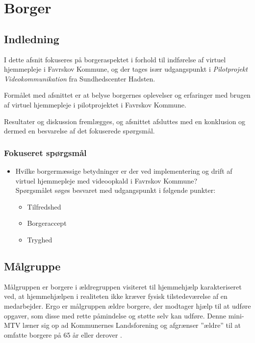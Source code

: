 \chapter{Borger}

\section{Indledning}
I dette afsnit fokuseres på borgeraspektet i forhold til indførelse af virtuel hjemmepleje i Favrskov Kommune, og der tages især udgangspunkt i \textit{Pilotprojekt Videokommunikation} fra Sundhedscenter Hadsten. 

Formålet med afsnittet er at belyse borgernes oplevelser og erfaringer med brugen af virtuel hjemmepleje i pilotprojektet i Favrskov Kommune. 

Resultater og diskussion fremlægges, og afsnittet afsluttes med en konklusion og dermed en besvarelse af det fokuserede spørgsmål.



\subsection{Fokuseret spørgsmål}
\begin{itemize}
	\item Hvilke borgermæssige betydninger er der ved implementering og drift af virtuel hjemmepleje med videoopkald i Favrskov Kommune? \\Spørgsmålet søges besvaret med udgangspunkt i følgende punkter:
	\begin{itemize}
	\item Tilfredshed
	\item Borgeraccept
	\item Tryghed
\end{itemize}
\end{itemize}

\section{Målgruppe}
\label{sec:mgruppe}
Målgruppen er borgere i ældregruppen visiteret til hjemmehjælp karakteriseret ved, at hjemmehjælpen i realiteten ikke kræver fysisk tilstedeværelse af en medarbejder. Ergo er målgruppen ældre borgere, der modtager hjælp til at udføre opgaver, som disse med rette påmindelse og støtte selv kan udføre. Denne mini-MTV læner sig op ad Kommunernes Landsforening og afgrænser ”ældre” til at omfatte borgere på 65 år eller derover \cite{KL}. 

